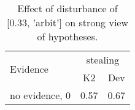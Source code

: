 \begin{table}\begin{tabular}{l|cc}\toprule\multirow{2}{*}{Evidence} & \multicolumn{2}{c}{stealing}\\& {K2} & {Dev}\\\midrule
no evidence, 0 & \cellcolor{Bittersweet}0.57&\cellcolor{Bittersweet}0.67\\\bottomrule\end{tabular}\caption{Effect of disturbance of [0.33, 'arbit'] on strong view of hypotheses.}\end{table}